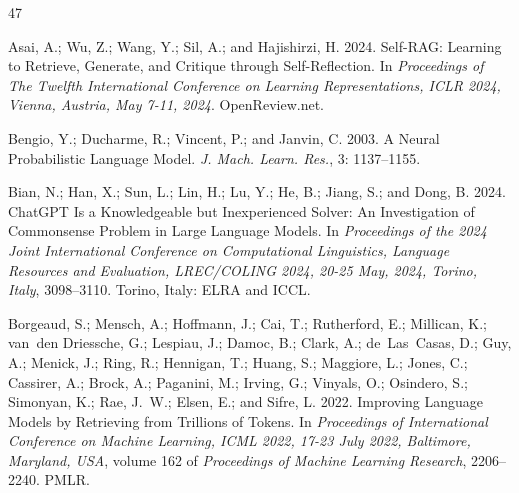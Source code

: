 \documentclass[letterpaper]{article} %
\begin{document}
\begin{thebibliography}{47}
    \providecommand{\natexlab}[1]{#1}
    
    Asai, A.; Wu, Z.; Wang, Y.; Sil, A.; and Hajishirzi, H. 2024.
    \newblock Self-RAG: Learning to Retrieve, Generate, and Critique through Self-Reflection.
    \newblock In \emph{Proceedings of The Twelfth International Conference on Learning Representations, {ICLR} 2024, Vienna, Austria, May 7-11, 2024}. OpenReview.net.
    
    Bengio, Y.; Ducharme, R.; Vincent, P.; and Janvin, C. 2003.
    \newblock A Neural Probabilistic Language Model.
    \newblock \emph{J. Mach. Learn. Res.}, 3: 1137--1155.
    
    Bian, N.; Han, X.; Sun, L.; Lin, H.; Lu, Y.; He, B.; Jiang, S.; and Dong, B. 2024.
    \newblock ChatGPT Is a Knowledgeable but Inexperienced Solver: An Investigation of Commonsense Problem in Large Language Models.
    \newblock In \emph{Proceedings of the 2024 Joint International Conference on Computational Linguistics, Language Resources and Evaluation, {LREC/COLING} 2024, 20-25 May, 2024, Torino, Italy}, 3098--3110. Torino, Italy: {ELRA} and {ICCL}.
    
    Borgeaud, S.; Mensch, A.; Hoffmann, J.; Cai, T.; Rutherford, E.; Millican, K.; van~den Driessche, G.; Lespiau, J.; Damoc, B.; Clark, A.; de~Las~Casas, D.; Guy, A.; Menick, J.; Ring, R.; Hennigan, T.; Huang, S.; Maggiore, L.; Jones, C.; Cassirer, A.; Brock, A.; Paganini, M.; Irving, G.; Vinyals, O.; Osindero, S.; Simonyan, K.; Rae, J.~W.; Elsen, E.; and Sifre, L. 2022.
    \newblock Improving Language Models by Retrieving from Trillions of Tokens.
    \newblock In \emph{Proceedings of International Conference on Machine Learning, {ICML} 2022, 17-23 July 2022, Baltimore, Maryland, {USA}}, volume 162 of \emph{Proceedings of Machine Learning Research}, 2206--2240. {PMLR}.
    

\end{thebibliography}
\end{document}
